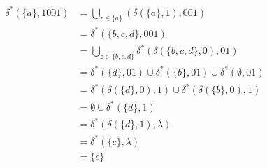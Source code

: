 
\begin{align*}
	\delta^*(\{a\},1001)&=\bigcup_{z\in\{a\}}(\delta(\{a\},1),001)\\
	&=\delta^*(\{b,c,d\},001)\\
	&=\bigcup_{z\in\{b,c,d\}}\delta^*(\delta(\{b,c,d\},0),01)\\
	&=\delta^*(\{d\},01)\cup\delta^*(\{b\},01)\cup\delta^*(\emptyset,01)\\
	&=\delta^*(\delta(\{d\},0),1)\cup\delta^*(\delta(\{b\},0),1)\\
	&=\emptyset\cup\delta^*(\{d\},1)\\
	&=\delta^*(\delta(\{d\},1),\lambda)\\
	&=\delta^*(\{c\},\lambda)\\
	&=\{c\}
\end{align*}
